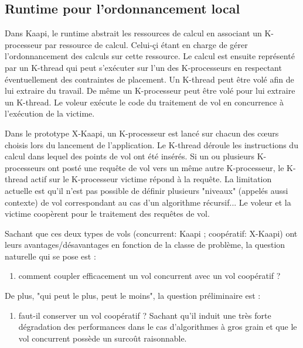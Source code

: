 \documentclass{report}
\begin{document}
\subsection{Runtime pour l'ordonnancement local}
Dans Kaapi, le runtime abstrait les ressources de calcul en associant un K-processeur par ressource de calcul. Celui-çi étant en charge de gérer l'ordonnancement des calculs sur cette ressource.  Le calcul est ensuite représenté par un K-thread qui peut s'exécuter sur l'un des K-processeurs en respectant éventuellement des contraintes de placement. Un K-thread peut être volé afin de lui extraire du travail. De même un K-processeur peut être volé pour lui extraire un K-thread. 
Le voleur exécute le code du traitement de vol en concurrence à l'exécution de la victime.

Dans le prototype X-Kaapi, un K-processeur est lancé sur chacun des cœurs choisis lors du lancement de l'application. Le K-thread déroule les instructions du calcul dans lequel des points de vol ont été insérés. Si un ou plusieurs K-processeurs ont posté une requête de vol vers un même autre K-processeur, le K-thread actif sur le K-processeur victime répond à la requête. La limitation actuelle est qu'il n'est pas possible de définir plusieurs "niveaux" (appelés aussi contexte) de vol correspondant au cas d'un algorithme récursif...
Le voleur et la victime coopèrent pour le traitement des requêtes de vol.

Sachant que ces deux types de vols (concurrent: Kaapi ; coopératif: X-Kaapi) ont leurs avantages/désavantages en fonction de la classe de problème, la question naturelle qui se pose est :
\begin{enumerate}[label=\textbf{Q \theenumi.},ref=\textbf{Q \theenumi},resume]
	\item comment coupler efficacement un vol concurrent avec un vol coopératif ?
\end{enumerate}

De plus, "qui peut le plus, peut le moins", la question préliminaire est :
\begin{enumerate}[label=\textbf{Q \theenumi.},ref=\textbf{Q \theenumi},resume]
	\item faut-il conserver un vol coopératif ? Sachant qu'il induit une très forte dégradation des performances dans le cas d'algorithmes à gros grain et que le vol concurrent possède un surcoût raisonnable.
\end{enumerate}
\end{document}
